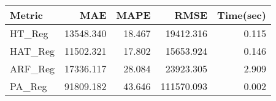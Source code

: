 \begin{tabular}{lrrrr}
\toprule
Metric &       MAE &   MAPE &       RMSE &  Time(sec) \\
\midrule
HT\_Reg  & 13548.340 & 18.467 &  19412.316 &      0.115 \\
HAT\_Reg & 11502.321 & 17.802 &  15653.924 &      0.146 \\
ARF\_Reg & 17336.117 & 28.084 &  23923.305 &      2.909 \\
PA\_Reg  & 91809.182 & 43.646 & 111570.093 &      0.002 \\
\bottomrule
\end{tabular}
